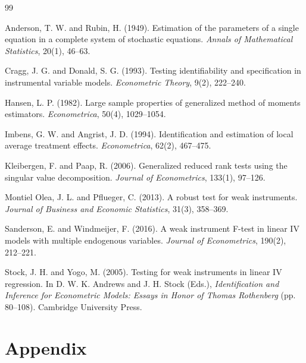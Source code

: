 \documentclass[11pt]{article}
\begin{document}
\begin{thebibliography}{99}
\setlength{\itemsep}{0pt}

Anderson, T. W. and Rubin, H. (1949). Estimation of the parameters of a single equation in a complete system of stochastic equations. \textit{Annals of Mathematical Statistics}, 20(1), 46--63.

Cragg, J. G. and Donald, S. G. (1993). Testing identifiability and specification in instrumental variable models. \textit{Econometric Theory}, 9(2), 222--240.

Hansen, L. P. (1982). Large sample properties of generalized method of moments estimators. \textit{Econometrica}, 50(4), 1029--1054.

Imbens, G. W. and Angrist, J. D. (1994). Identification and estimation of local average treatment effects. \textit{Econometrica}, 62(2), 467--475.

Kleibergen, F. and Paap, R. (2006). Generalized reduced rank tests using the singular value decomposition. \textit{Journal of Econometrics}, 133(1), 97--126.

Montiel Olea, J. L. and Pflueger, C. (2013). A robust test for weak instruments. \textit{Journal of Business and Economic Statistics}, 31(3), 358--369.

Sanderson, E. and Windmeijer, F. (2016). A weak instrument F-test in linear IV models with multiple endogenous variables. \textit{Journal of Econometrics}, 190(2), 212--221.

Stock, J. H. and Yogo, M. (2005). Testing for weak instruments in linear IV regression. In D. W. K. Andrews and J. H. Stock (Eds.), \textit{Identification and Inference for Econometric Models: Essays in Honor of Thomas Rothenberg} (pp. 80--108). Cambridge University Press.

\end{thebibliography}

\clearpage
\appendix
\section*{Appendix}
\setcounter{table}{0}
\renewcommand{\thetable}{A\arabic{table}}
\end{document}
